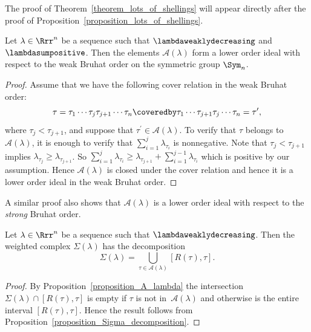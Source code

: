 The proof of Theorem~\ref{theorem_lots_of_shellings}
will appear directly
after the proof of Proposition~\ref{proposition_lots_of_shellings}.



\begin{prop}
Let $\lambda \in \Rrr^{n}$ be a sequence such that
$\lambdaweaklydecreasing$ and
$\lambdasumpositive$.
Then the elements $\mathcal{A}(\lambda)$
form a lower order ideal with respect to the weak Bruhat order
on the symmetric group $\Sym_{n}$.
\label{proposition_A_lambda}
\end{prop}
\begin{proof}
Assume that
we have the following cover relation in the
weak Bruhat order:
$$
\tau
= 
\tau_{1} \cdots \tau_{j} \tau_{j+1} \cdots \tau_{n}
\coveredby
\tau_{1} \cdots \tau_{j+1} \tau_{j} \cdots \tau_{n}=\tau^{\prime}, $$
where 
$\tau_{j} < \tau_{j+1}$, and suppose that $\tau^{\prime}\in\mathcal{A}(\lambda)$.
To verify that $\tau$ belongs to $\mathcal{A}(\lambda)$,
it is enough to verify that
$\sum_{i=1}^{j} \lambda_{\tau_{i}}$ is nonnegative.
Note that
$\tau_{j} < \tau_{j+1}$
implies
$\lambda_{\tau_{j}} \geq \lambda_{\tau_{j+1}}$.
So
$\sum_{i=1}^{j} \lambda_{\tau_{i}}
\geq
\lambda_{\tau_{j+1}}
+
\sum_{i=1}^{j-1} \lambda_{\tau_{i}}$
which is positive by our assumption.
Hence
$\mathcal{A}(\lambda)$ is closed under the cover relation and
hence it is a lower order ideal in the weak Bruhat order.
\end{proof}

\begin{remark}
{\rm
A similar proof also shows that $\mathcal{A}(\lambda)$ is a
lower order ideal with respect to the \emph{strong} Bruhat order.
}
\end{remark}

\begin{prop}
Let $\lambda \in \Rrr^{n}$ be a sequence such that
$\lambdaweaklydecreasing$.
Then the weighted complex $\Sigma(\lambda)$
has the decomposition
$$ \Sigma(\lambda) = \bigcup_{\tau \in \mathcal{A}(\lambda)} [R(\tau), \tau] . $$
\label{proposition_Sigma_lambda_decomposition}
\end{prop}
\begin{proof}
By Proposition~\ref{proposition_A_lambda}
the intersection $\Sigma(\lambda) \cap [R(\tau),\tau]$
is empty if $\tau$ is not in~$\mathcal{A}(\lambda)$
and otherwise is the entire interval $[R(\tau), \tau]$.
Hence the result follows from
Proposition~\ref{proposition_Sigma_decomposition}.
\end{proof}


